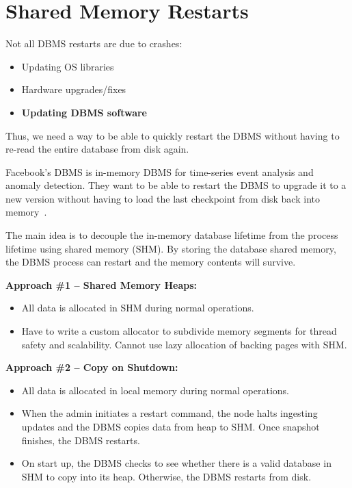 \documentclass[11pt]{article}
\begin{document}
\section{Shared Memory Restarts}
Not all DBMS restarts are due to crashes:
\begin{itemize}
    \item Updating OS libraries
    \item Hardware upgrades/fixes
    \item \textbf{Updating DBMS software}
\end{itemize}

Thus, we need a way to be able to quickly restart the DBMS without having to re-read the 
entire database from disk again.

Facebook's  DBMS is in-memory DBMS for time-series event analysis and anomaly 
detection. They want to be able to restart the DBMS to upgrade it to a new version without having 
to load the last checkpoint from disk back into memory~\cite{p541-goel}.

The main idea is to decouple the in-memory database lifetime from the process lifetime using 
shared memory (SHM). By storing the database shared memory, the DBMS process can restart and the 
memory contents will survive.

\textbf{Approach \#1 -- Shared Memory Heaps:}
\begin{itemize}
    \item
    All data is allocated in SHM during normal operations.
    
    \item
    Have to write a custom allocator to subdivide memory segments for thread safety and 
    scalability. Cannot use lazy allocation of backing pages with SHM.
\end{itemize}

\textbf{Approach \#2 -- Copy on Shutdown:}
\begin{itemize}
    \item
    All data is allocated in local memory during normal operations.
    
    \item
    When the admin initiates a restart command, the node halts ingesting updates and the DBMS copies 
    data from heap to SHM. Once snapshot finishes, the DBMS restarts.
    
    \item
    On start up, the DBMS checks to see whether there is a valid database in SHM to copy 
    into its heap. Otherwise, the DBMS restarts from disk.
\end{itemize}

\newpage


\end{document}
